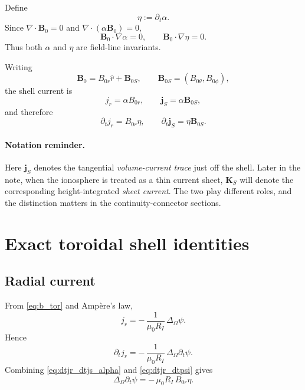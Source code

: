 \documentclass[11pt,a4paper]{article}
\begin{document}
Define
\[
\eta := \partial_t \alpha.
\]
Since $\nabla\cdot \mathbf B_0=0$ and $\nabla\cdot(\alpha \mathbf B_0)=0$,
\[
\mathbf B_0\cdot \nabla \alpha = 0,
\qquad
\mathbf B_0\cdot \nabla \eta = 0.
\]
Thus both $\alpha$ and $\eta$ are field-line invariants.

Writing
\[
\mathbf B_0 = B_{0r}\hat r + \mathbf B_{0S},
\qquad
\mathbf B_{0S}=(B_{0\theta},B_{0\phi}),
\]
the shell current is
\begin{equation}
j_r = \alpha B_{0r},
\qquad
\mathbf j_S = \alpha \mathbf B_{0S},
\label{eq:jr_js_alpha}
\end{equation}
and therefore
\begin{equation}
\partial_t j_r = B_{0r}\eta,
\qquad
\partial_t \mathbf j_S = \eta \mathbf B_{0S}.
\label{eq:dtjr_dtjs_alpha}
\end{equation}

\paragraph{Notation reminder.}
Here \(\mathbf j_S\) denotes the tangential \emph{volume-current trace} just
off the shell. Later in the note, when the ionosphere is treated as a thin
current sheet, \(\mathbf K_S\) will denote the corresponding
height-integrated \emph{sheet current}. The two play different roles, and the
distinction matters in the continuity-connector sections.

\section{Exact toroidal shell identities}

\subsection*{Radial current}

From \eqref{eq:b_tor} and Amp\`ere's law,
\begin{equation}
j_r = -\,\frac{1}{\mu_0 R_I}\,\Delta_\Omega \psi.
\label{eq:jr_psi}
\end{equation}
Hence
\begin{equation}
\partial_t j_r
=
-\,\frac{1}{\mu_0 R_I}\,\Delta_\Omega \partial_t \psi.
\label{eq:dtjr_dtpsi}
\end{equation}
Combining \eqref{eq:dtjr_dtjs_alpha} and \eqref{eq:dtjr_dtpsi} gives
\begin{equation}
\Delta_\Omega \partial_t \psi
=
-\,\mu_0 R_I\, B_{0r}\eta.
\label{eq:dtpsi_from_eta_core}
\end{equation}
\end{document}
